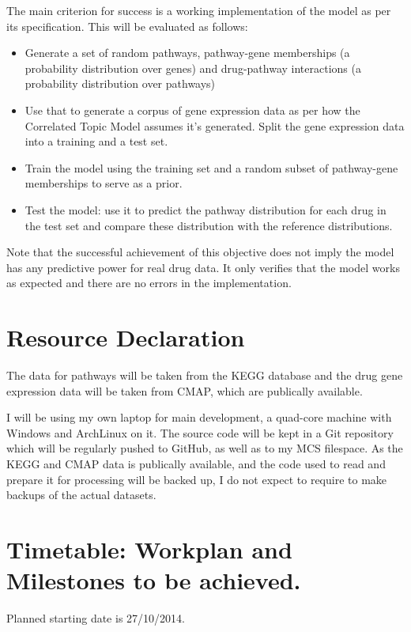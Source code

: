 \documentclass[12pt,a4]{article}
\begin{document}
The main criterion for success is a working implementation of the model as per its specification. This will be evaluated as follows:
\begin{itemize} 
\item Generate a set of random pathways, pathway-gene memberships (a probability distribution over genes) and drug-pathway interactions (a probability distribution over pathways)
\item Use that to generate a corpus of gene expression data as per how the Correlated Topic Model assumes it's generated. Split the gene expression data into a training and a test set.
\item Train the model using the training set and a random subset of pathway-gene memberships to serve as a prior.
\item Test the model: use it to predict the pathway distribution for each drug in the test set and compare these distribution with the reference distributions.
\end{itemize}

Note that the successful achievement of this objective does not imply the model has any predictive power for real drug data. It only verifies that the model works as expected and there are no errors in the implementation.

\section*{Resource Declaration}

The data for pathways will be taken from the KEGG database and the drug gene expression data will be taken from CMAP, which are publically available.

I will be using my own laptop for main development, a quad-core machine with Windows and ArchLinux on it. The source code will be kept in a Git repository which will be regularly pushed to GitHub, as well as to my MCS filespace. As the KEGG and CMAP data is publically available, and the code used to read and prepare it for processing will be backed up, I do not expect to require to make backups of the actual datasets.

\section*{Timetable: Workplan and Milestones to be achieved.}

Planned starting date is 27/10/2014.
\end{document}
